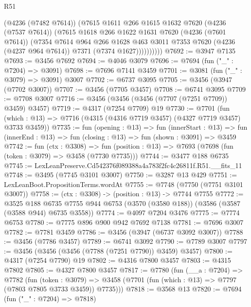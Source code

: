 \begin{lexlean}{R51}
\begin{coremodule}
                (@4236 (@7482 @7614))
                (@7615
                  @1611
                  @266
                  @1615
                  @1632
                  @7620
                  (@4236 (@7537 @7614))
                  (@7615
                    @1618
                    @266
                    @1622
                    @1631
                    @7620
                    (@4236 (@7601 @7614))
                    (@7354
                      @7614
                      @964
                      @266
                      @1628
                      @463
                      @3011
                      @7353
                      @7620
                      (@4236 (@4237 @964 @7614))
                      @7371
                      (@7374 @1627))))))))))
@7692 := @3947 @7135
@7693 := @3456 @7692
@7694 := @4046 @3079
@7696 := @7694 (fun ("_" : @7204) => @3091)
@7698 := @7696 @7141 @3459
@7701 := @3081 (fun ("_" : @3079) => @3091) @3007
@7702 := @6737 @3095
@7705 := @3456 (@3947 (@7702 @3007))
@7707 := @3456 (@7705 @3457)
@7708 := @6741 @3095
@7709 := @7708 @3007
@7716 := @3456 (@3456 (@3456 (@7707 (@7251 @7709)) @3459) @3457)
@7719 := @4317 (@7254 @7709) @19
@7730 := @7701
    (fun (which : @13) => @7716 (@4315 (@4316 @7719 @3457) (@4327 @7719 @3457) @3733 @3459))
@7735 := fun (opening : @13) =>
  fun (innerStart : @13) =>
  fun (innerEnd : @13) => fun (closing : @13) => fun (shown : @3091) => @3459
@7742 := fun (ctx : @3308) =>
  fun (position : @13) => @7693 (@7698 (fun (token : @3079) => @3458 (@7730 @7735)))
@7744 := @3477 @188 @6735
@7745 := LexLeanPreserve.Cd542376f089388a4a783f2fc4c26811f.R51.__fits_11
@7748 := @3495 (@7745 @3101 @3007)
@7750 := @3287 @13 @429
@7751 := LexLeanBoot.PropositionTerms.wordAt
@7755 := @7748 (@7750 (@7751 @3101 @3007))
@7758 := (ctx : @3308) -> (position : @13) -> @7744 @7755
@7772 := @3525
    @188
    @6735
    @7755
    @944
    @6753
    (@3570 (@3580 @188))
    (@3586 (@3587 (@3588 @944) @6735 @3558))
@7774 := @4097 @7204 @3476
@7775 := @7774 @6753
@7780 := @7775 @896 @900 @942 @7692 @7138
@7781 := @7696 @3007
@7782 := @7781 @3459
@7786 := @3456 (@3947 (@6737 @3092 @3007))
@7788 := @3456 (@7786 @3457)
@7789 := @6741 @3092
@7790 := @7789 @3007
@7797 := @3456 (@3456 (@3456 (@7788 (@7251 @7790)) @3459) @3457)
@7800 := @4317 (@7254 @7790) @19
@7802 := @4316 @7800 @3457
@7803 := @4315 @7802
@7805 := @4327 @7800 @3457
@7817 := @7780
    (fun (__a : @7204) =>
    @7782
      (fun (token : @3079) =>
      @3458 (@7701 (fun (which : @13) => @7797 (@7803 @7805 @3733 @3459)) @7735)))
@7818 := @3568 @13
@7820 := @7694 (fun ("_" : @7204) => @7818)

\end{coremodule}
\end{lexlean}

